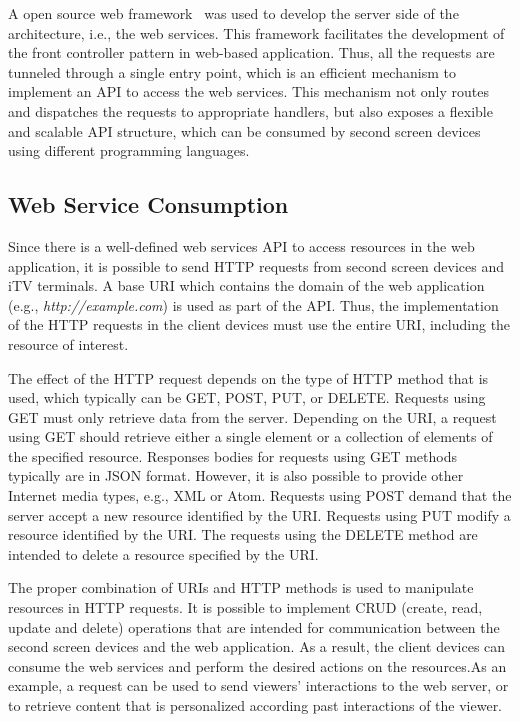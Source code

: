 \documentclass[journal]{IEEEtran}
\begin{document}
A open source web framework~\cite{Wheeler2013} was used to develop the server side of the architecture, i.e., the web services. This framework facilitates the development of the front controller pattern in web-based application. Thus, all the requests are tunneled through a single entry point, which is an efficient mechanism to implement an API to access the web services. This mechanism not only routes and dispatches the requests to appropriate handlers, but also exposes a flexible and scalable API structure, which can be consumed by second screen devices using different programming languages.

\subsection{Web Service Consumption}

Since there is a well-defined web services API to access resources in the web application, it is possible to send HTTP requests from second screen devices and iTV terminals. A base URI which contains the domain of the web application (e.g., \emph{http://example.com}) is used as part of the API. Thus, the implementation of the HTTP requests in the client devices must use the entire URI, including the resource of interest.

The effect of the HTTP request depends on the type of HTTP method that is used, which typically can be GET, POST, PUT, or DELETE. Requests using GET must only retrieve data from the server. Depending on the URI, a request using GET should retrieve either a single element or a collection of elements of the specified resource. Responses bodies for requests using GET methods typically are in JSON format. However, it is also possible to provide other Internet media types, e.g., XML or Atom. Requests using POST demand that the server accept a new resource identified by the URI. Requests using PUT modify a resource identified by the URI. The requests using the DELETE method are intended to delete a resource specified by the URI.

The proper combination of URIs and HTTP methods is used to manipulate resources in HTTP requests. It is possible to implement CRUD (create, read, update and delete) operations that are intended for communication between the second screen devices and the web application. As a result, the client devices can consume the web services and perform the desired actions on the resources.As an example, a request can be used to send viewers' interactions to the web server, or to retrieve content that is personalized according past interactions of the viewer.
\end{document}

